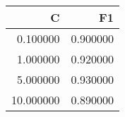 \begin{tabular}{rr}
\toprule
C & F1 \\
\midrule
0.100000 & 0.900000 \\
1.000000 & 0.920000 \\
5.000000 & 0.930000 \\
10.000000 & 0.890000 \\
\bottomrule
\end{tabular}
